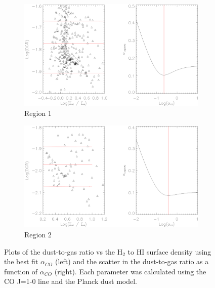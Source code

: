 \begin{figure}%
  \begin{subfigure}[t]{1\textwidth}
    \centering
    \includegraphics[width=1.\textwidth]{dgr_imgs/region_1_aco_output_10.eps}
    \caption{Region 1}
  \end{subfigure}

  \begin{subfigure}[t]{1\textwidth}
    \centering
    \includegraphics[width=1.\textwidth]{dgr_imgs/region_2_aco_output_10.eps}
    \caption{Region 2}
  \end{subfigure}
   \caption[Dust-to-Gas Ratio Determination Plots for CO J=1-0]{Plots of the dust-to-gas ratio vs the H$_2$ to HI surface density using the best fit $\alpha_{CO}$ (left) and the scatter in the dust-to-gas ratio as a function of $\alpha_{CO}$ (right).  Each parameter was calculated using the CO J=1-0 line and the Planck dust model.}
   \label{fig:dgr_co10}
\end{figure}

